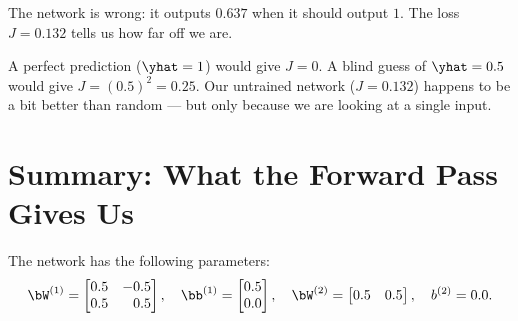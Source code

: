 \documentclass[12pt, a4paper]{article}
\begin{document}
The network is wrong: it outputs $0.637$ when it should output $1$.
The loss $J = 0.132$ tells us how far off we are.

\begin{notebox}
  A perfect prediction ($\yhat = 1$) would give $J = 0$.
  A blind guess of $\yhat = 0.5$ would give $J = (0.5)^2 = 0.25$.
  Our untrained network ($J = 0.132$) happens to be a bit better than random
  --- but only because we are looking at a single input.
\end{notebox}

\section{Summary: What the Forward Pass Gives Us}
The network has the following parameters:
\[
  \bW^{(1)} = \begin{bmatrix} 0.5 & -0.5 \\ 0.5 & \phantom{-}0.5 \end{bmatrix},
  \quad
  \bb^{(1)} = \begin{bmatrix} 0.5 \\ 0.0 \end{bmatrix},
  \quad
  \bW^{(2)} = \begin{bmatrix} 0.5 & 0.5 \end{bmatrix},
  \quad
  b^{(2)} = 0.0.
\]
\end{document}
